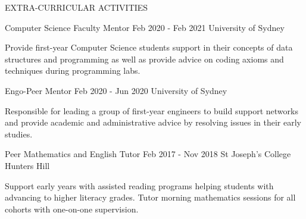 
\begin{ResumeSection}{EXTRA-CURRICULAR ACTIVITIES} 

    
    \begin{DatedField}
        {Computer Science Faculty Mentor}
        {Feb 2020 - Feb 2021}
        {University of Sydney}
        {}
        \item Provide first-year Computer Science students support in their concepts of data structures and programming as well as provide advice on coding axioms and techniques during programming labs.
    \end{DatedField}

    \vspace{-0.75em}
    
    \begin{DatedField}
        {Engo-Peer Mentor}
        {Feb 2020 - Jun 2020}
        {University of Sydney}
        {}
        \item Responsible for leading a group of first-year engineers to build support networks and provide academic and administrative advice by resolving issues in their early studies.
    \end{DatedField}

    \vspace{-0.75em}
    
    \begin{DatedField}
        {Peer Mathematics and English Tutor}
        {Feb 2017 - Nov 2018}
        {St Joseph's College Hunters Hill}
        {}
        \item Support early years with assisted reading programs helping students with advancing to higher literacy grades. Tutor morning mathematics sessions for all cohorts with one-on-one supervision.
    \end{DatedField}
    
    
\end{ResumeSection}